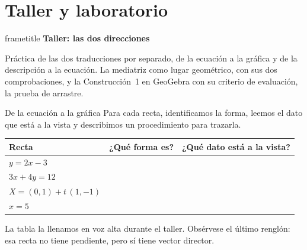 \documentclass[aspectratio=169,10pt]{beamer}
\newcommand{\hojaSesion}[2]{%
  \vfill
  \begin{beamercolorbox}[wd=\textwidth,sep=16pt,center]{frametitle}
    {\Large\bfseries #1}\\[11pt]
    \begin{minipage}{0.82\textwidth}\centering\small #2\end{minipage}
  \end{beamercolorbox}
  \vfill}
\begin{document}
\section{Taller y laboratorio}
\begin{frame}[plain]
  \hojaSesion{Taller: las dos direcciones}{%
  Práctica de las dos traducciones por separado, de la ecuación a la
  gráfica y de la descripción a la ecuación. La mediatriz como lugar
  geométrico, con sus dos comprobaciones, y la Construcción~1 en
  GeoGebra con su criterio de evaluación, la prueba de arrastre.}
\end{frame}
\begin{frame}{De la ecuación a la gráfica}
  Para cada recta, identificamos la forma, leemos el dato que está a
  la vista y describimos un procedimiento para trazarla.

  \vspace{0.2cm}
  \begin{center}
  {\small
  \begin{tabular}{@{}lcc@{}}
    \toprule
    \textbf{Recta} & \textbf{¿Qué forma es?} & \textbf{¿Qué dato está a la vista?} \\
    \midrule
    $y=2x-3$ & & \\[8pt]
    $3x+4y=12$ & & \\[8pt]
    $X=(0,1)+t\,(1,-1)$ & & \\[8pt]
    $x=5$ & & \\
    \bottomrule
  \end{tabular}}
  \end{center}

  \vspace{0.4cm}
  {\footnotesize La tabla la llenamos en voz alta durante el taller.
  Obsérvese el último renglón: esa recta no tiene pendiente, pero sí
  tiene vector director.}
\end{frame}
\end{document}
